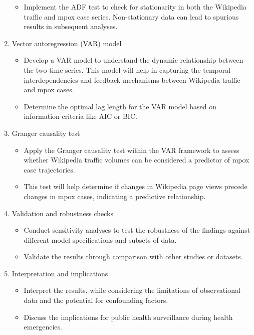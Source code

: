 \documentclass[
  letterpaper,
  DIV=11,
  numbers=noendperiod]{scrartcl}
\providecommand{\tightlist}{%
  \setlength{\itemsep}{0pt}\setlength{\parskip}{0pt}}\usepackage{longtable,booktabs,array}
\begin{document}
\begin{enumerate}
  \begin{itemize}
  \tightlist
  \item
    Implement the ADF test to check for stationarity in both the
    Wikipedia traffic and mpox case series. Non-stationary data can lead
    to spurious results in subsequent analyses.
  \end{itemize}
\item
  Vector autoregression (VAR) model

  \begin{itemize}
  \tightlist
  \item
    Develop a VAR model to understand the dynamic relationship between
    the two time series. This model will help in capturing the temporal
    interdependencies and feedback mechanisms between Wikipedia traffic
    and mpox cases.
  \item
    Determine the optimal lag length for the VAR model based on
    information criteria like AIC or BIC.
  \end{itemize}
\item
  Granger causality test

  \begin{itemize}
  \tightlist
  \item
    Apply the Granger causality test within the VAR framework to assess
    whether Wikipedia traffic volumes can be considered a predictor of
    mpox case trajectories.
  \item
    This test will help determine if changes in Wikipedia page views
    precede changes in mpox cases, indicating a predictive relationship.
  \end{itemize}
\item
  Validation and robustness checks

  \begin{itemize}
  \tightlist
  \item
    Conduct sensitivity analyses to test the robustness of the findings
    against different model specifications and subsets of data.
  \item
    Validate the results through comparison with other studies or
    datasets.
  \end{itemize}
\item
  Interpretation and implications

  \begin{itemize}
  \tightlist
  \item
    Interpret the results, while considering the limitations of
    observational data and the potential for confounding factors.
  \item
    Discuss the implications for public health surveillance during
    health emergencies.
  \end{itemize}
\end{enumerate}
\end{document}
